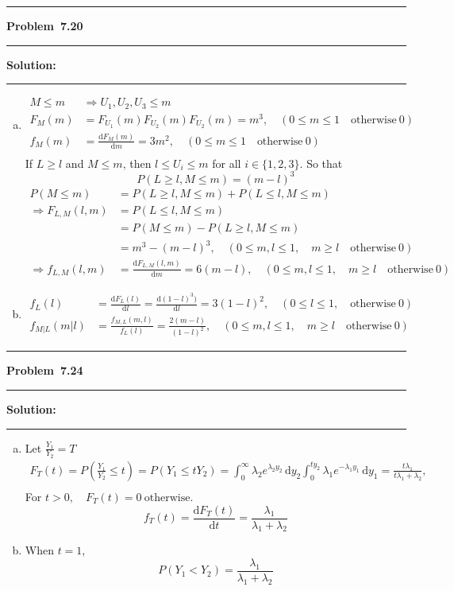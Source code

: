 \documentclass[10.5pt]{article}
\newcommand\question[1]{\vspace{.2in}\hrule\vspace{0.04in}\textbf{Problem\ #1}\vspace{.4em}\hrule\vspace{.10in}}
\newcommand\Solution{\vspace{.3in}\textbf{Solution:}\vspace{.5em}\hrule\vspace{.08in}\par}
\begin{document}
\question{7.20}
\Solution{}
\begin{enumerate}[(a)]
	\item \begin{align*}
		M \leqslant m &\Rightarrow U_1,U_2,U_3 \leqslant m\\[8pt]
		F_M(m) &= F_{U_1}(m)F_{U_2}(m)F_{U_2}(m) = m^3,\quad (0\leqslant m \leqslant 1\quad\text{otherwise}\ 0)\\[8pt]
		f_M(m) &= \frac{\mathrm{d} F_M(m)}{\mathrm{d} m} = 3m^2,\quad (0\leqslant m \leqslant 1\quad\text{otherwise}\ 0)\\[8pt]
	\end{align*}
	If $L\geqslant l$ and $M\leqslant m$, then $l\leqslant U_i\leqslant m$ for all $i\in\{1, 2, 3\}$. So that $$P(L\geqslant l, M\leqslant m) = (m - l)^3$$
	\begin{align*}
		P(M\leqslant m) &= P(L\geqslant l, M\leqslant m) + P(L\leqslant l, M\leqslant m)\\[8pt]
		\Rightarrow F_{L, M}(l, m) &= P(L\leqslant l, M\leqslant m)\\[8pt]
		&= P(M\leqslant m) - P(L\geqslant l, M\leqslant m)\\[8pt]
		&= m^3 - (m - l)^3,\quad( 0\leqslant m,l \leqslant 1,\quad m\geqslant l\quad\text{otherwise}\ 0)\\[8pt]
		\Rightarrow f_{L, M}(l, m) &= \frac{\mathrm{d} F_{L, M}(l, m)}{\mathrm{d} m} = 6(m - l),\quad( 0\leqslant m,l \leqslant 1,\quad m\geqslant l\quad\text{otherwise}\ 0)
	\end{align*}\vspace{1cm}
	\item \begin{align*}
		f_L(l) &= \frac{\mathrm{d} F_L(l)}{\mathrm{d} l}  = \frac{\mathrm{d} (1-l)^3)}{\mathrm{d} l} = 3(1 - l)^2,\quad( 0\leqslant l \leqslant 1,\quad\text{otherwise}\ 0)\\[6pt]
		f_{M|L}(m|l) &= \frac{f_{M,L}(m,l)}{f_L(l)} = \frac{2(m - l)}{(1 - l)^2},\quad( 0\leqslant m,l \leqslant 1,\quad m\geqslant l\quad\text{otherwise}\ 0)
	\end{align*}
\end{enumerate}
\pagebreak

\question{7.24}
\Solution{}
\begin{enumerate}[(a)]
	\item Let $\frac{Y_1}{Y_2} = T$\begin{align*}
		F_T(t) = P(\frac{Y_1}{Y_2}\leqslant t) = P(Y_1\leqslant tY_2)
		= \int_{0}^{\infty}\lambda_2 e^{\lambda_2 y_2}\,\mathrm{d}y_2\int_{0}^{ty_2}\lambda_1 e^{-\lambda_1 y_1}\,\mathrm{d}y_1 = \frac{t\lambda_1}{t\lambda_1+\lambda_2},\\[6pt]
	\end{align*}
	For $t>0,\quad F_T(t) = 0\ \text{otherwise}$.$$f_T(t) = \frac{\mathrm{d} F_T(t)}{\mathrm{d} t} = \frac{\lambda_1}{\lambda_1+\lambda_2}$$\vspace{0.5cm}
	\item When $t = 1$, $$P(Y_1<Y_2) = \frac{\lambda_1}{\lambda_1+\lambda_2}$$
\end{enumerate}
\vspace{1cm}
\end{document}
